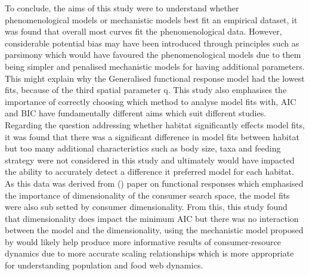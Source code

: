 \documentclass[11pt]{article}
\begin{document}
To conclude, the aims of this study were to understand whether phenomenological models or mechanistic models best fit an empirical dataset, it was found that overall most curves fit the phenomenological data. However, considerable potential bias may have been introduced through principles such as parsimony which would have favoured the phenomenological models due to them being simpler and penalised mechanistic models for having additional parameters. This might explain why the Generalised functional response model had the lowest fits, because of the third spatial parameter q. This study also emphasises the importance of correctly choosing which method to analyse model fits with, AIC and BIC have fundamentally different aims which suit different studies. Regarding the question addressing whether habitat significantly effects model fits, it was found that there was a significant difference in model fits between habitat but too many additional characteristics such as body size, taxa and feeding strategy were not considered in this study and ultimately would have impacted the ability to accurately detect a difference it preferred model for each habitat. As this data was derived from (\cite{Pawar2012}) paper on functional responses which emphasised the importance of dimensionality of the consumer search space, the model fits were also sub setted by consumer dimensionality. From this, this study found that dimensionality does impact the minimum AIC but there was no interaction between the model and the dimensionality, using the mechanistic model proposed by \cite{Pawar2012} would likely help produce more informative results of consumer-resource dynamics due to more accurate scaling relationships which is more appropriate for understanding population and food web dynamics. 
	
\newpage


\vspace*{1\baselineskip}
\printbibliography 


\newpage
\end{document}
